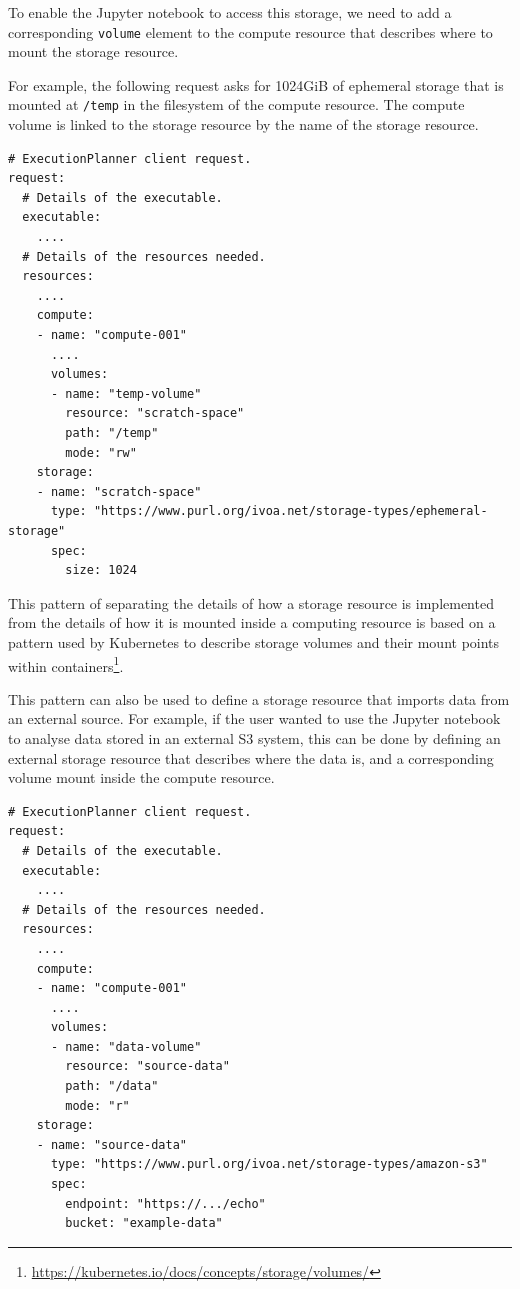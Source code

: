\documentclass[11pt,a4paper]{ivoa}
\newcommand{\jupyternotebook} {Jupyter notebook}
\newcommand{\kubernetes} {Kubernetes}
\newcommand{\codeword}[1] {\texttt{#1}}
\newcommand{\footurl}[1] {\footnote{\url{#1}}}
\begin{document}
To enable the \jupyternotebook{} to access this storage, we need to add a
corresponding \codeword{volume} element to the compute resource that describes
where to mount the storage resource.

For example, the following request asks for 1024GiB of ephemeral storage
that is mounted at \codeword{/temp} in the filesystem of the compute resource.
The compute volume is linked to the storage resource by the name of the
storage resource.

\begin{lstlisting}[]
# ExecutionPlanner client request.
request:
  # Details of the executable.
  executable:
    ....
  # Details of the resources needed.
  resources:
    ....
    compute:
    - name: "compute-001"
      ....
      volumes:
      - name: "temp-volume"
        resource: "scratch-space"
        path: "/temp"
        mode: "rw"
    storage:
    - name: "scratch-space"
      type: "https://www.purl.org/ivoa.net/storage-types/ephemeral-storage"
      spec:
        size: 1024
\end{lstlisting}

This pattern of separating the details of how a storage resource is implemented
from the details of how it is mounted inside a computing resource is based on a
pattern used by \kubernetes{} to describe storage volumes and their mount points
within containers\footurl{https://kubernetes.io/docs/concepts/storage/volumes/}.

This pattern can also be used to define a storage resource that imports data from
an external source.
For example, if the user wanted to use the \jupyternotebook{} to analyse data stored
in an external S3 system, this can be done by defining an external storage resource
that describes where the data is,
and a corresponding volume mount inside the compute resource.

\begin{lstlisting}[]
# ExecutionPlanner client request.
request:
  # Details of the executable.
  executable:
    ....
  # Details of the resources needed.
  resources:
    ....
    compute:
    - name: "compute-001"
      ....
      volumes:
      - name: "data-volume"
        resource: "source-data"
        path: "/data"
        mode: "r"
    storage:
    - name: "source-data"
      type: "https://www.purl.org/ivoa.net/storage-types/amazon-s3"
      spec:
        endpoint: "https://.../echo"
        bucket: "example-data"
\end{lstlisting}
\end{document}
